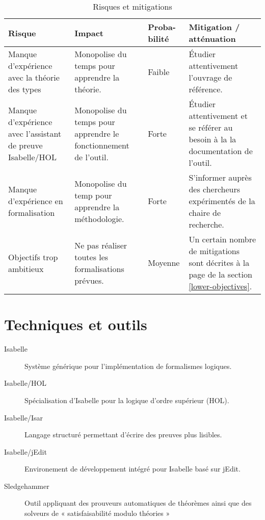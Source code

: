 \documentclass[a4paper, oneside, 12pt, titlepage, draft]{article}
\begin{document}
\begin{table}[!h]
  \small
  \begin{tabular}{|p{3.5cm}|p{3.5cm}|p{1.5cm}|p{3.5cm}|}
    \hline
    \textbf{Risque} &
    \textbf{Impact} &
    \textbf{Proba-bilité} &
    \textbf{Mitigation / \newline atténuation} \\
    \hline
    Manque d'expérience avec la théorie des types &
    Monopolise du temps pour apprendre la théorie. &
    Faible &
    Étudier attentivement l'ouvrage de référence. \\
    \hline
    Manque d'expérience avec l'assistant de preuve Isabelle/HOL &
    Monopolise du temps pour apprendre le fonctionnement de l'outil. &
    Forte &
    Étudier attentivement et se référer au besoin à la la documentation de l'outil. \\
    \hline
    Manque d'expérience en formalisation &
    Monopolise du temp pour apprendre la méthodologie. &
    Forte &
    S'informer auprès des chercheurs expérimentés de la chaire de recherche. \\
    \hline
    Objectifs trop ambitieux &
    Ne pas réaliser toutes les formalisations prévues. &
    Moyenne &
    Un certain nombre de mitigations sont décrites à la page \pageref{lower-objectives} de la
    section \ref{lower-objectives}. \\
    \hline
  \end{tabular}
  \caption{Risques et mitigations}
  \label{tab:risks}
\end{table}

\section{Techniques et outils}

\begin{description}
  \item[Isabelle] Système générique pour l'implémentation de formalismes logiques.
  \item[Isabelle/HOL] Spécialisation d'Isabelle pour la logique d'ordre supérieur (\gls{HOL}).
  \item[Isabelle/Isar] Langage structuré permettant d'écrire des preuves plus lisibles.
  \item[Isabelle/jEdit] Environement de développement intégré pour Isabelle basé sur jEdit.
  \item[Sledgehammer] Outil appliquant des prouveurs automatiques de théorèmes ainsi que des
    solveurs de « satisfaisabilité modulo théories »
\end{description}
\end{document}
